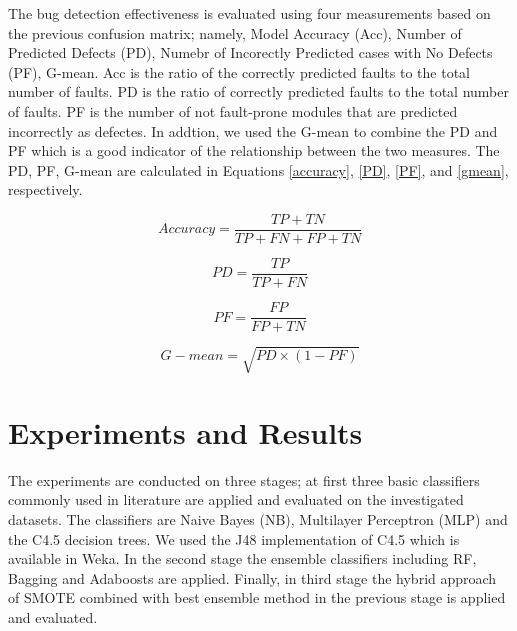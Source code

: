 \documentclass[runningheads,a4paper]{llncs}
\begin{document}
The bug detection effectiveness is evaluated using four measurements based on the previous confusion matrix; namely, Model Accuracy (Acc), Number of Predicted Defects (PD), Numebr of Incorectly Predicted cases with No Defects (PF), G-mean. Acc is the ratio of the correctly predicted faults to the total number of faults. PD is
the ratio of correctly predicted faults to the total number of faults. PF is the number of not fault-prone modules that are predicted incorrectly as defectes. In addtion, we used the G-mean to combine the PD and PF which is a good indicator of the relationship between the two measures. The PD, PF, G-mean are calculated in Equations \ref{accuracy}, \ref{PD}, \ref{PF}, and \ref{gmean}, respectively.

\begin{equation}
Accuracy=\frac{TP+TN}{TP + FN + FP + TN}
\label{accuracy}
\end{equation}

\begin{equation}
PD=\frac{TP}{TP+FN}
\label{PD}
\end{equation}

\begin{equation}
PF=\frac{FP}{FP+TN}
\label{PF}
\end{equation}

\begin{equation}
G-mean=\sqrt{PD \times (1-PF)}
\label{gmean}
\end{equation}




\section{Experiments and Results}
\label{experiments}

The experiments are conducted on three stages; at first three basic classifiers commonly used in literature are applied and evaluated on the investigated datasets. The classifiers are Naive Bayes (NB), Multilayer Perceptron (MLP) and the C4.5 decision trees. We used the J48 implementation of C4.5 which is available in Weka. In the second stage the ensemble classifiers including RF, Bagging and Adaboosts are applied. Finally, in third stage the hybrid approach of SMOTE combined with best ensemble method in the previous stage is applied and evaluated.
\end{document}
